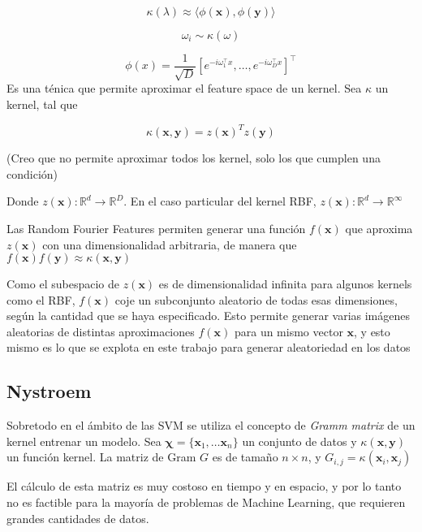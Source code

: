 \documentclass{article}
\newcommand{\reals}{\mathds{R}}
\newcommand{\vx}{\bm{x}}
\newcommand{\vy}{\bm{y}}
\newcommand{\transp}{\intercal}
\newcommand{\kernel}{\kappa}
\begin{document}
\begin{equation}
  \kernel(\lambda) \approx \langle\phi(\vx), \phi(\vy)\rangle
\end{equation}

\begin{equation}
  \omega_i \sim \kappa(\omega)
\end{equation}

\begin{equation}
  \phi(x) = \frac{1}{\sqrt{D}}\left[ e^{-i\omega^\transp_1x}, \ldots, e^{-i\omega^\transp_Dx} \right]^\transp
\end{equation}
Es una ténica que permite aproximar el feature space de un kernel. Sea $\kappa$
un kernel, tal que

\begin{equation}
 \kappa(\vx, \vy) = z(\vx)^Tz(\vy)
\end{equation}

(Creo que no permite aproximar todos los kernel, solo los que cumplen una condición)

Donde
$z(\vx) : \reals^d \rightarrow \reals^D$.
En el caso particular del
kernel RBF,
$z(\vx) : \reals^d \rightarrow \reals^\infty$

Las Random Fourier Features permiten generar una función $f(\vx)$ que aproxima $z(\vx)$
con una dimensionalidad arbitraria, de manera que
$f(\vx)f(\vy) \approx \kappa(\vx, \vy)$

Como el subespacio de $z(\vx)$ es de dimensionalidad infinita para algunos kernels
como el RBF, $f(\vx)$ coje un subconjunto aleatorio de todas esas dimensiones,
según la cantidad que se haya especificado. Esto permite generar varias imágenes
aleatorias de distintas aproximaciones $f(\vx)$ para un mismo vector $\vx$, y esto
mismo es lo que se explota en este trabajo para generar aleatoriedad en los datos

\subsection{Nystroem}

Sobretodo en el ámbito de las SVM se utiliza el concepto de \textit{Gramm matrix}
de un kernel entrenar un modelo. Sea
$\bm{\chi} = \{\vx_1, \ldots \vx_n\}$
un conjunto de datos y
$\kappa(\vx, \vy)$
un función kernel. La matriz de Gram $G$
es de tamaño $n \times n$, y
$G_{i,j} = \kappa(\vx_i, \vx_j)$

El cálculo de esta matriz es muy costoso en tiempo y en espacio, y por lo tanto
no es factible para la mayoría de problemas de Machine Learning, que requieren
grandes cantidades de datos.
\end{document}
